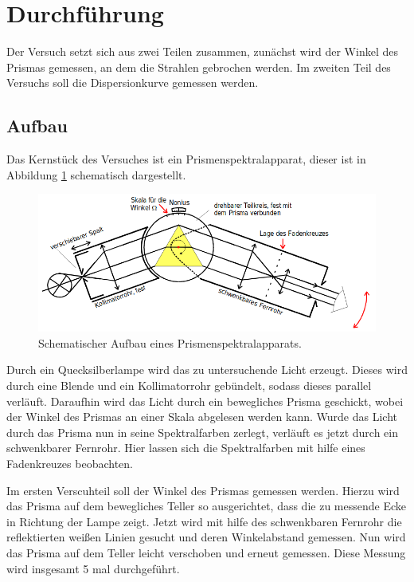 \section{Durchführung}
Der Versuch setzt sich aus zwei Teilen zusammen, zunächst wird der Winkel des Prismas gemessen, an dem die Strahlen gebrochen werden. Im zweiten Teil des Versuchs
soll die Dispersionkurve gemessen werden.

\subsection{Aufbau}
Das Kernstück des Versuches ist ein Prismenspektralapparat, dieser ist in Abbildung \ref{abb:3} schematisch dargestellt.
\begin{figure}
  \centering
  \includegraphics[scale=0.4]{3.png}
  \caption{Schematischer Aufbau eines Prismenspektralapparats. \cite{Q1}}
  \label{abb:3}
\end{figure}
Durch ein Quecksilberlampe wird das zu untersuchende Licht erzeugt. Dieses wird durch eine Blende und ein Kollimatorrohr gebündelt, sodass dieses parallel verläuft.
Daraufhin wird das Licht durch ein bewegliches Prisma geschickt, wobei der Winkel des Prismas an einer Skala abgelesen werden kann. Wurde das Licht durch das Prisma
nun in seine Spektralfarben zerlegt, verläuft es jetzt durch ein schwenkbarer Fernrohr. Hier lassen sich die Spektralfarben mit hilfe eines Fadenkreuzes beobachten.

Im ersten Verscuhteil soll der Winkel des Prismas gemessen werden. Hierzu wird das Prisma auf dem bewegliches Teller so ausgerichtet, dass die zu messende Ecke
in Richtung der Lampe zeigt. Jetzt wird mit hilfe des schwenkbaren Fernrohr die reflektierten weißen Linien gesucht und deren Winkelabstand gemessen. Nun wird das
Prisma auf dem Teller leicht verschoben und erneut gemessen. Diese Messung wird insgesamt 5 mal durchgeführt.

